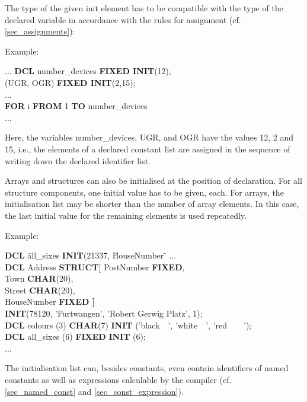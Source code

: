 The type of the given init element has to be compatible with the type of
the declared variable in accordance with the rules for assignment (cf.
\ref{sec_assignments}):

Example:

...
{\bf DCL} number\_devices {\bf FIXED INIT}(12),\\
\x (UGR, OGR) {\bf FIXED INIT}(2,15);\\
...\\
{\bf FOR} i {\bf FROM} 1 {\bf TO} number\_devices\\
...

Here, the variables number\_devices, UGR, and OGR have the values 12, 2
and 15, i.e., the elements of a declared constant list are assigned in
the sequence of writing down the declared identifier list.

Arrays and structures can also be initialised at the position of
declaration. For all structure components, one initial value has to be
given, each. For arrays, the initialisation list may be shorter than the
number of array elements. In this case, the last initial value for the
remaining elements is used repeatedly.

Example:

\begin{tabbing}
{\bf DCL} \= all\_sixes \= {\bf INIT}(21337, \= HouseNumber \= \kill
... \> \> \> \> \\
{\bf DCL} \> Address \> {\bf STRUCT}[ \> PostNumber  \> {\bf FIXED},\\
          \>         \>               \> Town        \> {\bf CHAR}(20),\\
          \>         \>               \> Street      \> {\bf CHAR}(20),\\
          \>         \>               \> HouseNumber \> {\bf FIXED \hspace{1cm} ]}\\
          \>         \> {\bf INIT}(78120, 'Furtwangen', 'Robert Gerwig Platz', 1); \> \> \\
{\bf DCL} \> colours \> (3)           \> {\bf CHAR}(7) \> {\bf INIT} ('black\ \ ', 'white\ \ ', 'red\ \ \ \ ');\\
{\bf DCL} \> all\_sixes \> (6)        \> {\bf FIXED}  \> {\bf INIT} (6);\\
... \> \> \> \>
\end{tabbing}

The initialisation list can, besides constants, even contain identifiers
of named constants as well as expressions calculable by the compiler
(cf. \ref{sec_named_const} and \ref{sec_const_expression}).

